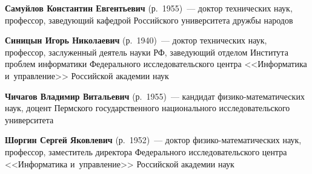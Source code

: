 \begin{multicols}{2}
\noindent
  \textbf{Самуйлов Константин Евгентьевич} (р.\ 1955)~---
  доктор технических наук, профессор,  заведующий кафедрой 
  Российского университета дружбы народов 


\vspace*{3pt}


\noindent
  \textbf{Синицын Игорь Николаевич} (р.\ 1940)~--- доктор технических наук,
  профессор, заслуженный деятель науки РФ, заведующий отделом Института
  проб\-лем информатики Федерального исследовательского центра
  <<Информатика и~управ\-ле\-ние>> Российской академии наук

   \vspace*{3pt}


\noindent
  \textbf{Чичагов Владимир Витальевич} (р.\ 1955)~---
  кандидат фи\-зи\-ко-ма\-те\-ма\-ти\-че\-ских наук, доцент
  Пермского государственного национального исследовательского университета

  \vspace*{3pt}

\noindent
  \textbf{Шоргин Сергей Яковлевич} (р.\ 1952)~---
  доктор фи\-зи\-ко-ма\-те\-ма\-ти\-че\-ских наук,  
  профессор, заместитель директора Федерального исследовательского цент\-ра 
  <<Информатика и~управление>> Российской академии наук


 \label{end\stat}










\end{multicols}

\newpage